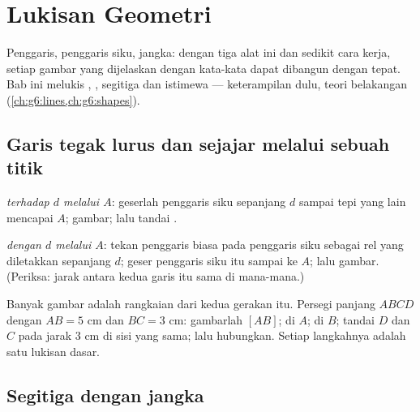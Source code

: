 \chapter{Lukisan Geometri}\label{ch:g5:geometry}

Penggaris, penggaris siku, jangka: dengan tiga alat ini dan sedikit
cara kerja, setiap gambar yang dijelaskan dengan kata-kata dapat
dibangun dengan tepat. Bab ini melukis , , segitiga dan  istimewa --- keterampilan dulu,
teori belakangan (\cref{ch:g6:lines,ch:g6:shapes}).

\section{Garis tegak lurus dan sejajar melalui sebuah titik}

\begin{method}\label{met:g5:geometry:basic}
\emph{ terhadap $d$ melalui $A$}: geserlah
penggaris siku sepanjang $d$ sampai tepi  yang
lain mencapai $A$; gambar; lalu tandai .

\emph{ dengan $d$ melalui $A$}: tekan penggaris biasa
pada penggaris siku sebagai rel yang diletakkan sepanjang $d$; geser
penggaris siku itu sampai ke $A$; lalu gambar. (Periksa: jarak
antara kedua garis itu sama di mana-mana.)
\end{method}

\begin{example}\label{ex:g5:geometry:chain}
Banyak gambar adalah rangkaian dari kedua gerakan itu. Persegi
panjang $ABCD$ dengan $AB = 5$ cm dan $BC = 3$ cm: gambarlah $[AB]$;
 di $A$;  di $B$; tandai $D$ dan
$C$ pada jarak $3$ cm di sisi yang sama; lalu hubungkan. Setiap
langkahnya adalah satu lukisan dasar.
\end{example}

\section{Segitiga dengan jangka}

